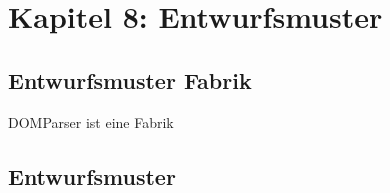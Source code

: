 \section{Kapitel 8: Entwurfsmuster}

\subsection{Entwurfsmuster Fabrik}

DOMParser ist eine Fabrik

\subsection{Entwurfsmuster }